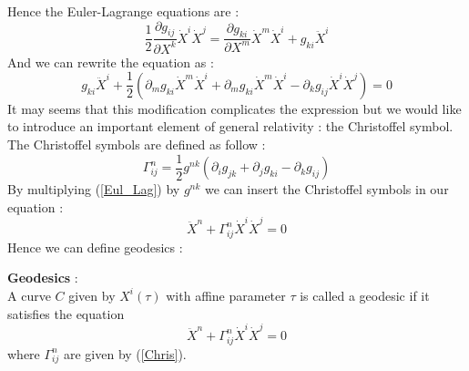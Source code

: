 \documentclass[a4paper,12pt]{article}
\theoremstyle{definition}
\begin{document}
Hence the Euler-Lagrange equations are :
\begin{equation}
	\frac{1}{2}\frac{\partial g_{ij}}{\partial X^k}\dot{X}^i\dot{X}^j=
	\frac{\partial g_{ki}}{\partial X^m}\dot{X}^m\dot{X}^i+g_{ki}\ddot{X}^i
\end{equation}
And we can rewrite the equation as :
\begin{equation}\label{Eul_Lag}
	g_{ki}\ddot{X}^i+\frac{1}{2}(\partial_m g_{ki}\dot{X}^m\dot{X}^i+\partial_m g_{ki}\dot{X}^m\dot{X}^i-\partial_k g_{ij}\dot{X}^i\dot{X}^j)=0
\end{equation}
It may seems that this modification complicates the expression but we would like to introduce an important element of general relativity : the Christoffel symbol.
The Christoffel symbols are defined as follow :
\begin{equation}\label{Chris}
	\Gamma^n_{ij}=\frac{1}{2}g^{nk}(\partial_i g_{jk}+\partial_j g_{ki}-\partial_k g_{ij})
\end{equation}
By multiplying (\ref{Eul_Lag}) by $g^{nk}$ we can insert the Christoffel symbols in our equation :
\begin{equation}
	\ddot{X}^n+\Gamma^n_{ij}\dot{X}^i\dot{X}^j=0
\end{equation}
Hence we can define geodesics :
\begin{definition}
	\textbf{Geodesics} :\\
	A curve $C$ given by $X^i(\tau)$ with affine parameter $\tau$ is called a geodesic if it satisfies the equation
	\begin{equation}\label{Geodesic}
		\ddot{X}^n+\Gamma^n_{ij}\dot{X}^i\dot{X}^j=0
	\end{equation}
	where $\Gamma^n_{ij}$ are given by (\ref{Chris}).
\end{definition}
\end{document}

